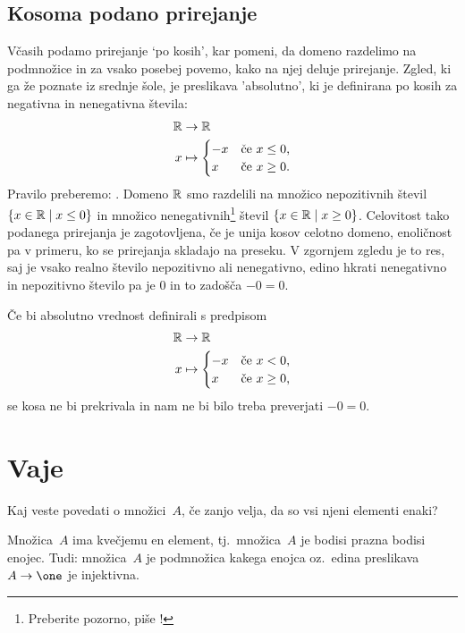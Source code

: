 \subsection{Kosoma podano prirejanje}

Včasih podamo prirejanje `po kosih', kar pomeni, da domeno razdelimo na podmnožice in za vsako posebej povemo, kako na njej deluje prirejanje.
%
Zgled, ki ga že poznate iz srednje šole, je preslikava 'absolutno', ki je definirana po kosih za negativna in nenegativna števila:
% 
\begin{align*}
  \mathbb{R} &\to \mathbb{R} \\
  x &\mapsto
      \begin{cases}
        -x & \text{če $x \leq 0$,}\\
        x & \text{če $x \geq 0$.}
      \end{cases}
\end{align*}
% 
Pravilo preberemo: .
%
Domeno $\mathbb{R}$ smo razdelili na množico nepozitivnih števil $\left\{x \in \mathbb{R} \; \middle| \; x \leq 0\right\}$ in množico nenegativnih\footnote{Preberite pozorno, piše !} števil $\left\{x \in \mathbb{R} \; \middle| \; x \geq 0\right\}$.
%
Celovitost tako podanega prirejanja je zagotovljena, če je unija kosov celotno domeno,
enoličnost pa v primeru, ko se prirejanja skladajo na preseku.
%
V zgornjem zgledu je to res, saj je vsako realno število nepozitivno ali nenegativno, edino hkrati nenegativno in nepozitivno število pa je $0$ in to zadošča $-0 = 0$.

Če bi absolutno vrednost definirali s predpisom
%
\begin{align*}
  \mathbb{R} &\to \mathbb{R} \\
  x &\mapsto
      \begin{cases}
        -x & \text{če $x < 0$,}\\
        x & \text{če $x \geq 0$,}
      \end{cases}
\end{align*}
%
se kosa ne bi prekrivala in nam ne bi bilo treba preverjati $-0 = 0$.



\section{Vaje}

\begin{vaja}
Kaj veste povedati o množici~$A$, če zanjo velja, da so vsi njeni elementi enaki?
\begin{resitev}
Množica~$A$ ima kvečjemu en element, tj.~množica~$A$ je bodisi prazna bodisi enojec. Tudi: množica~$A$ je podmnožica kakega enojca oz.~edina preslikava $A \to \one$ je injektivna.
\end{resitev}
\end{vaja}

